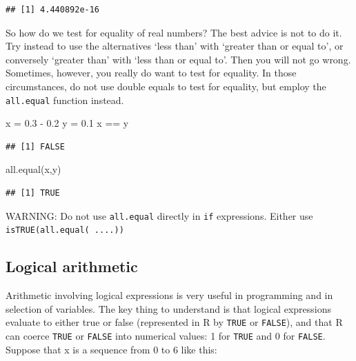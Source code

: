 \documentclass[
]{book}
\newenvironment{Shaded}{\begin{snugshade}}{\end{snugshade}}
\newcommand{\FloatTok}[1]{\textcolor[rgb]{0.00,0.00,0.81}{#1}}
\newcommand{\FunctionTok}[1]{\textcolor[rgb]{0.00,0.00,0.00}{#1}}
\newcommand{\NormalTok}[1]{#1}
\newcommand{\OtherTok}[1]{\textcolor[rgb]{0.56,0.35,0.01}{#1}}
\newcommand{\SpecialCharTok}[1]{\textcolor[rgb]{0.00,0.00,0.00}{#1}}
\theoremstyle{definition}
\theoremstyle{definition}
\theoremstyle{definition}
\theoremstyle{definition}
\theoremstyle{remark}
\begin{document}
\begin{verbatim}
## [1] 4.440892e-16
\end{verbatim}

So how do we test for equality of real numbers? The best advice is not to do it. Try instead to use the alternatives `less than' with `greater than or equal to', or conversely `greater than' with `less than or equal to'. Then you will not go wrong. Sometimes, however, you really do want to test for equality. In those circumstances, do not use double equals to test for equality, but employ the \texttt{all.equal} function instead.

\begin{Shaded}
\begin{Highlighting}[]
\NormalTok{x }\OtherTok{=} \FloatTok{0.3} \SpecialCharTok{{-}} \FloatTok{0.2}
\NormalTok{y }\OtherTok{=} \FloatTok{0.1}
\NormalTok{x }\SpecialCharTok{==}\NormalTok{ y}
\end{Highlighting}
\end{Shaded}

\begin{verbatim}
## [1] FALSE
\end{verbatim}

\begin{Shaded}
\begin{Highlighting}[]
\FunctionTok{all.equal}\NormalTok{(x,y)}
\end{Highlighting}
\end{Shaded}

\begin{verbatim}
## [1] TRUE
\end{verbatim}

WARNING: Do not use \texttt{all.equal} directly in \texttt{if} expressions. Either use \texttt{isTRUE(all.equal(\ ....))}

\hypertarget{logical-arithmetic}{%
\subsection{Logical arithmetic}\label{logical-arithmetic}}

Arithmetic involving logical expressions is very useful in programming and in selection of variables. The key thing to understand is that logical expressions evaluate to either true or false (represented in R by \texttt{TRUE} or \texttt{FALSE}), and that R can coerce \texttt{TRUE} or \texttt{FALSE} into numerical values: 1 for \texttt{TRUE} and 0 for \texttt{FALSE}. Suppose that x is a sequence from 0 to 6 like this:
\end{document}
